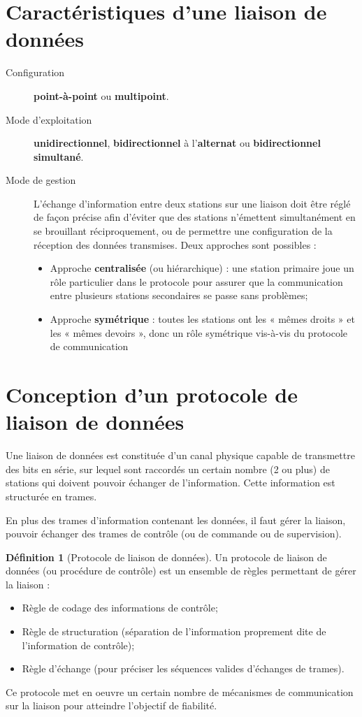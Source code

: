 \documentclass[11pt,english,french]{scrreprt}
\theoremstyle{remark}
\theoremstyle{definition}
\newtheorem*{def*}{Définition}
\begin{document}
\section{Caractéristiques d'une liaison de données} %

\begin{description}
	\item[Configuration] \textbf{point-à-point} ou \textbf{multipoint}.
	\item[Mode d'exploitation] \textbf{unidirectionnel}, \textbf{bidirectionnel} à l'\textbf{alternat} ou \textbf{bidirectionnel simultané}.
	\item[Mode de gestion] L'échange d'information entre deux stations sur une liaison doit être réglé de façon précise afin d'éviter que des stations n'émettent simultanément en se brouillant réciproquement, ou de permettre une configuration de la réception des données transmises. Deux approches sont possibles :\begin{itemize}
		\item Approche \textbf{centralisée} (ou hiérarchique) : une station primaire joue un rôle particulier dans le protocole pour assurer que la communication entre plusieurs stations secondaires se passe sans problèmes;
		\item Approche \textbf{symétrique} : toutes les stations ont les « mêmes droits » et les « mêmes devoirs », donc un rôle symétrique vis-à-vis du protocole de communication
	\end{itemize}  
\end{description}

\section{Conception d'un protocole de liaison de données} %

Une liaison de données est constituée d'un canal physique capable de transmettre des bits en série, sur lequel sont raccordés un certain nombre (2 ou plus) de stations qui doivent pouvoir échanger de l'information. Cette information est structurée en trames.

En plus des trames d'information contenant les données, il faut gérer la liaison, pouvoir échanger des trames de contrôle (ou de commande ou de supervision).

\begin{def*}[Protocole de liaison de données]
	Un protocole de liaison de données (ou procédure de contrôle) est un ensemble de règles permettant de gérer la liaison :\begin{itemize}
		\item Règle de codage des informations de contrôle;
		\item Règle de structuration (séparation de l'information proprement dite de l'information de contrôle);
		\item Règle d'échange (pour préciser les séquences valides d'échanges de trames).
	\end{itemize}
	
	Ce protocole met en oeuvre un certain nombre de mécanismes de communication sur la liaison pour atteindre l'objectif de fiabilité.
\end{def*}
\end{document}
